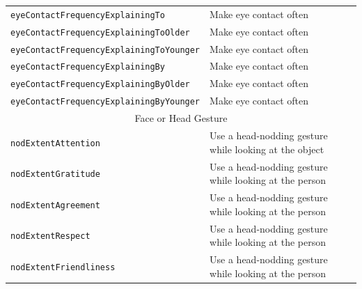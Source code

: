 \documentclass{CSSRforAfrica}
\begin{document}
\begin{table}[H]
\begin{center}
\begin{tabular}{|l l|}
{\footnotesize \verb+eyeContactFrequencyExplainingTo+} 	    & {\footnotesize \verb++ Make eye contact often} \vspace{-1.01mm}\\
{\footnotesize \verb+eyeContactFrequencyExplainingToOlder+} 	    & {\footnotesize \verb++ Make eye contact often} \vspace{-1.01mm}\\
{\footnotesize \verb+eyeContactFrequencyExplainingToYounger+} 	    & {\footnotesize \verb++ Make eye contact often} \vspace{-1.01mm}\\
{\footnotesize \verb+eyeContactFrequencyExplainingBy+} 	    & {\footnotesize \verb++ Make eye contact often}\vspace{-1.01mm} \\
{\footnotesize \verb+eyeContactFrequencyExplainingByOlder+} 	    & {\footnotesize \verb++ Make eye contact often}\vspace{-1.01mm} \\
{\footnotesize \verb+eyeContactFrequencyExplainingByYounger+} 	    & {\footnotesize \verb++ Make eye contact often} \\
\hline
\multicolumn{2}{|c|}{{\footnotesize Face or Head Gesture}}  \vspace{-0mm}\\
\hline
{\footnotesize \verb+nodExtentAttention+} 	                           & {\footnotesize \verb++ Use a head-nodding gesture while looking at the object}\vspace{-1mm} \\
{\footnotesize \verb+nodExtentGratitude+} 	                           & {\footnotesize \verb++ Use a head-nodding gesture while looking at the  person}\vspace{-1.01mm} \\
{\footnotesize \verb+nodExtentAgreement+} 	                           & {\footnotesize \verb++ Use a head-nodding gesture while looking at the  person }\vspace{-1.01mm} \\
{\footnotesize \verb+nodExtentRespect+} 	                           & {\footnotesize \verb++ Use a head-nodding gesture while looking at the  person }\vspace{-1.01mm} \\
{\footnotesize \verb+nodExtentFriendliness+} 	                    & {\footnotesize \verb++ Use a head-nodding gesture while looking at the  person}\vspace{-1.01mm} \\

\end{tabular}
\end{center}
\end{table}
\end{document}
